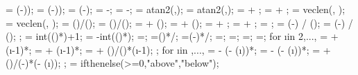 {{		\loaddxaright = \loaddxf*(\midratioright-\loadendratio)); %
		\loaddyaright = \loaddyf*(\midratioright-\loadendratio)); %
		\lenaright = \lenf*(\midratioright-\loadendratio);
		\dahleft = \loadarrowheightmid-\loadarrowheightleft;
		\dahright = \loadarrowheightmid-\loadarrowheightright;
		\ldangleleft = atan2(\dahleft,\lenaleft);
		\ldangleright = atan2(\dahright,\lenaright);
		\totalangleleft = \loadangle + \ldangleleft;
		\totalangleright = \loadangle + \ldangleright;
		\totallengthleft = veclen(\lenaleft, \dahleft); %
		\totallengthright = veclen(\lenaright, \dahright); %
		\loadwxvalue = (\loaddxa)/(); %
		\loadwyvalue = (\loaddya)/(); %
		 = \loadstartcoordx + \loaddxf*(\loadstartratio);
		 = \loadstartcoordy + \loaddyf*(\loadstartratio);
		\loadxvalue{\loadarrownumber} =  + \loaddxa;
		\loadyvalue{\loadarrownumber} =  + \loaddya;
		\loadarrownumbermo = ;
		\arrlenratioleft = (\midratioleft-\loadstartratio) / (\arrforceratio);
		\arrlenratioright = (\midratioright-\loadendratio) / (\arrforceratio);
		;
		\leftendarrno = int(()*\arrlenratioleft)+1;
		\rightstartarrno = \loadarrownumber-int(()*\arrlenratioright);
		\rightendarrno=\loadarrownumbermo;
		\leftendarrratio=()*\loadwxvalue/\loaddxaleft;
		\rightstartarrratio=(\loadarrownumber-\rightstartarrno)*\loadwxvalue/\loaddxaright;
		\leftendarrdist=\leftendarrratio*\lenaleft;
		\dahleftend=\leftendarrratio*\dahleft;
		\rightstartarrdist=\rightstartarrratio*\lenaright;
		\dahrightstart=\rightstartarrratio*\dahright;
		for \i in {2,...,{\leftendarrno}}{
			\loadxvalue{\i} =  + (\i-1)*\loadwxvalue;
			\loadyvalue{\i} =  + (\i-1)*\loadwyvalue;
			\loadarrowheight{\i} = \loadarrowheightleft + (\dahleftend)/()*(\i-1);
		};
		for \i in {{\rightendarrno},...,{\rightstartarrno}}{
			\loadxvalue{\i} = \loadxvalue{\loadarrownumber} - (\loadarrownumber - (\i))*\loadwxvalue;
			\loadyvalue{\i} = \loadyvalue{\loadarrownumber} - (\loadarrownumber - (\i))*\loadwyvalue;
			\loadarrowheight{\i} = \loadarrowheightright + (\dahrightstart)/(\loadarrownumber-\rightstartarrno)*(\loadarrownumber - (\i));
		};
		\loc = ifthenelse(\loadarrowheightleft>=0,"above","below");
	}
	
}
